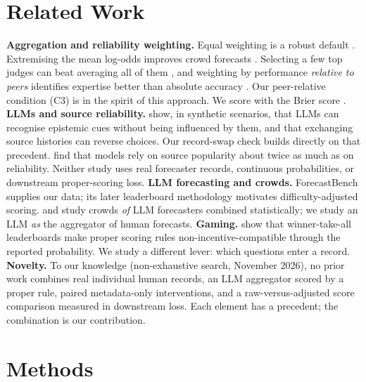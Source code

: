 \documentclass[11pt,letterpaper]{article}
\begin{document}
\section{Related Work}
\textbf{Aggregation and reliability weighting.} Equal weighting is a robust default \citep{clemen1989}. Extremising
the mean log-odds improves crowd forecasts \citep{satopaa2014}. Selecting a few top judges can beat averaging all
of them \citep{mannes2014}, and weighting by performance \emph{relative to peers} identifies expertise better than absolute
accuracy \citep{budescu2015}. Our peer-relative condition (C3) is in the spirit of this approach. We score with the Brier
score \citep{brier1950}.
\textbf{LLMs and source reliability.} \citet{zhang2026} show, in synthetic scenarios, that LLMs can recognise
epistemic cues without being influenced by them, and that exchanging source histories can reverse choices. Our
record-swap check builds directly on that precedent. \citet{ashkinaze2026} find that models rely on source popularity
about twice as much as on reliability. Neither study uses real forecaster records, continuous probabilities, or
downstream proper-scoring loss.
\textbf{LLM forecasting and crowds.} ForecastBench \citep{karger2025} supplies our data; its later leaderboard
methodology motivates difficulty-adjusted scoring. \citet{schoenegger2024} and \citet{douven2026} study crowds \emph{of} LLM forecasters
combined statistically; we study an LLM \emph{as} the aggregator of human forecasts.
\textbf{Gaming.} \citet{witkowski2018} show that winner-take-all leaderboards make proper scoring rules
non-incentive-compatible through the reported probability. We study a different lever: which questions enter a record.
\textbf{Novelty.} To our knowledge (non-exhaustive search, November 2026), no prior work combines real individual human
records, an LLM aggregator scored by a proper rule, paired metadata-only interventions, and a raw-versus-adjusted score
comparison measured in downstream loss. Each element has a precedent; the combination is our contribution.

\section{Methods}
\end{document}
